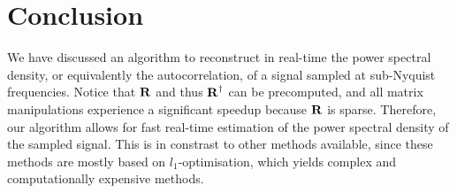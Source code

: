 \documentclass[a4paper, openany, oneside]{memoir}
\begin{document}
\section{Conclusion}
We have discussed an algorithm to reconstruct in real-time the power spectral density, or equivalently the autocorrelation, of a signal sampled at sub-Nyquist frequencies. Notice that $\boldsymbol{\mathbf{R}}$ and thus $\boldsymbol{\mathbf{R}}^\dagger$ can be precomputed, and all matrix manipulations experience a significant speedup because $\boldsymbol{\mathbf{R}}$ is sparse. Therefore, our algorithm allows for fast real-time estimation of the power spectral density of the sampled signal. This is in constrast to other methods available, since these methods are mostly based on $l_1$-optimisation, which yields complex and computationally expensive methods.
\end{document}
